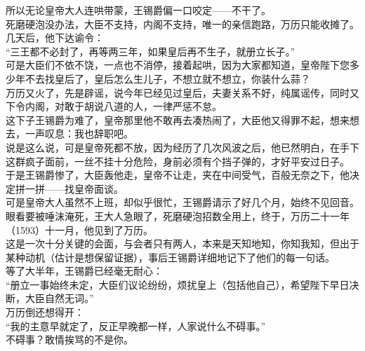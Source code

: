 \begin{multicols}{\theparacolNo}
所以无论皇帝大人连哄带蒙，王锡爵偏一口咬定——不干了。\\

死磨硬泡没办法，大臣不支持，内阁不支持，唯一的亲信跑路，万历只能收摊了。\\

几天后，他下达谕令：\\

“三王都不必封了，再等两三年，如果皇后再不生子，就册立长子。”\\

可是大臣们不依不饶，一点也不消停，接着起哄，因为大家都知道，皇帝陛下您多少年不去找皇后了，皇后怎么生儿子，不想立就不想立，你装什么蒜？\\

万历又火了，先是辟谣，说今年已经见过皇后，夫妻关系不好，纯属谣传，同时又下令内阁，对敢于胡说八道的人，一律严惩不怠。\\

这下子王锡爵为难了，皇帝那里他不敢再去凑热闹了，大臣他又得罪不起，想来想去，一声叹息：我也辞职吧。\\

说是这么说，可是皇帝死都不放，因为经历了几次风波之后，他已然明白，在手下这群疯子面前，一丝不挂十分危险，身前必须有个挡子弹的，才好平安过日子。\\

于是王锡爵惨了，大臣轰他走，皇帝不让走，夹在中间受气，百般无奈之下，他决定拼一拼——找皇帝面谈。\\

可是皇帝大人虽然不上班，却似乎很忙，王锡爵请示了好几个月，始终不见回音。眼看要被唾沫淹死，王大人急眼了，死磨硬泡招数全用上，终于，万历二十一年（1593）十一月，他见到了万历。\\

这是一次十分关键的会面，与会者只有两人，本来是天知地知，你知我知，但出于某种动机（估计是想保留证据），事后王锡爵详细地记下了他们的每一句话。\\

等了大半年，王锡爵已经毫无耐心：\\

“册立一事始终未定，大臣们议论纷纷，烦扰皇上（包括他自己），希望陛下早日决断，大臣自然无词。”\\

万历倒还想得开：\\

“我的主意早就定了，反正早晚都一样，人家说什么不碍事。”\\

不碍事？敢情挨骂的不是你。\\


\end{multicols}
